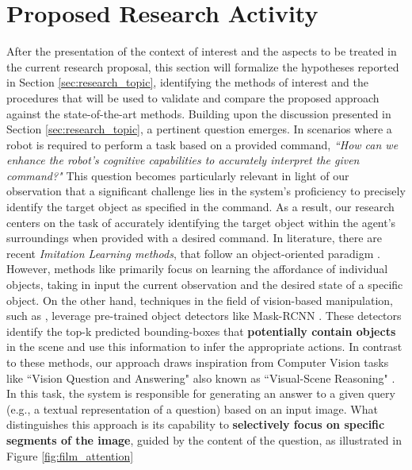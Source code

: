 \section{Proposed Research Activity}
\label{sec:research_activity}
After the presentation of the context of interest and the aspects to be treated in the current research proposal, this section will formalize the hypotheses reported in Section \ref{sec:research_topic}, identifying the methods of interest and the procedures that will be used to validate and compare the proposed approach against the state-of-the-art methods.
Building upon the discussion presented in Section \ref{sec:research_topic}, a pertinent question emerges. In scenarios where a robot is required to perform a task based on a provided command, \textit{``How can we enhance the robot's cognitive capabilities to accurately interpret the given command?"} This question becomes particularly relevant in light of our observation that a significant challenge lies in the system's proficiency to precisely identify the target object as specified in the command. As a result, our research centers on the task of accurately identifying the target object within the agent's surroundings when provided with a desired command.
\newline In literature, there are recent \textit{Imitation Learning methods}, that follow an object-oriented paradigm \cite{park2021object, belkhale2023plato, zhu2023viola, jiang2023vima}. However, methods like \cite{belkhale2023plato} primarily focus on learning the affordance of individual objects, taking in input the current observation and the desired state of a specific object. On the other hand, techniques in the field of vision-based manipulation, such as \cite{zhu2023viola, jiang2023vima}, leverage pre-trained object detectors like Mask-RCNN \cite{he2017mask}. These detectors identify the top-k predicted bounding-boxes that \textbf{potentially contain objects} in the scene and use this information to infer the appropriate actions. In contrast to these methods, our approach draws inspiration from Computer Vision tasks like ``Vision Question and Answering" also known as ``Visual-Scene Reasoning" \cite{perez2018film}. In this task, the system is responsible for generating an answer to a given query (e.g., a textual representation of a question) based on an input image. What distinguishes this approach is its capability to \textbf{selectively focus on specific segments of the image}, guided by the content of the question, as illustrated in Figure \ref{fig:film_attention}


